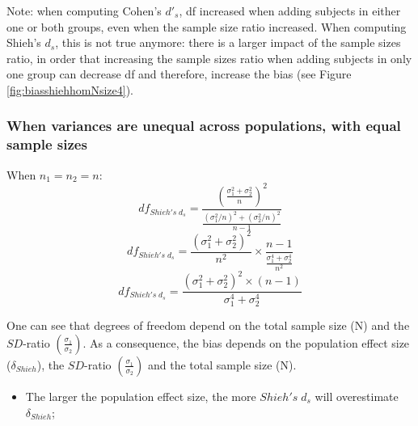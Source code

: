 \documentclass[
  man]{apa6}
\providecommand{\tightlist}{%
  \setlength{\itemsep}{0pt}\setlength{\parskip}{0pt}}
\begin{document}
Note: when computing Cohen's \(d'_s\), df increased when adding subjects in either one or both groups, even when the sample size ratio increased. When computing Shieh's \(d_s\), this is not true anymore: there is a larger impact of the sample sizes ratio, in order that increasing the sample sizes ratio when adding subjects in only one group can decrease df and therefore, increase the bias (see Figure \ref{fig:biasshiehhomNsize4}).

\hypertarget{when-variances-are-unequal-across-populations-with-equal-sample-sizes-1}{%
\subsubsection{When variances are unequal across populations, with equal sample sizes}\label{when-variances-are-unequal-across-populations-with-equal-sample-sizes-1}}

When \(n_1=n_2=n\):
\[df_{Shieh's \; d_s} = \frac{\left( \frac{\sigma_1^2+\sigma_2^2}{n} \right)^2}{\frac{(\sigma_1^2/n)^2+(\sigma_2^2/n)^2}{n-1}}\]
\[df_{Shieh's \; d_s} = \frac{(\sigma_1^2+\sigma_2^2)^2}{n^2} \times\frac{n-1}{\frac{\sigma_1^4+\sigma_2^4}{n^2}}\]
\[df_{Shieh's \; d_s} = \frac{(\sigma_1^2+\sigma_2^2)^2 \times (n-1)}{\sigma_1^4+\sigma_2^4}\]

One can see that degrees of freedom depend on the total sample size (N) and the \(SD\)-ratio \(\left( \frac{\sigma_1}{\sigma_2}\right)\). As a consequence, the bias depends on the population effect size (\(\delta_{Shieh}\)), the \(SD\)-ratio \(\left( \frac{\sigma_1}{\sigma_2}\right)\) and the total sample size (N).

\begin{itemize}
\tightlist
\item
  The larger the population effect size, the more \(Shieh's \; d_s\) will overestimate \(\delta_{Shieh}\);
\end{itemize}
\end{document}
